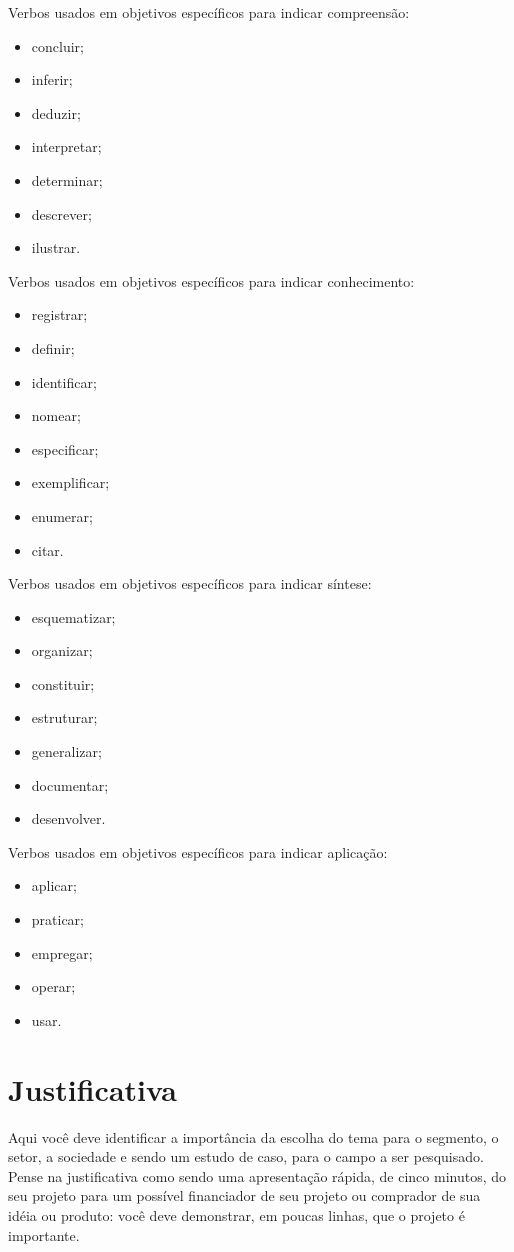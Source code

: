 Verbos usados em objetivos específicos para indicar compreensão:
\begin{itemize}
\item concluir;
\item inferir;
\item deduzir;
\item interpretar;
\item determinar;
\item descrever;
\item ilustrar.
\end{itemize}

Verbos usados em objetivos específicos para indicar conhecimento:
\begin{itemize}
\item registrar;
\item definir;
\item identificar;
\item nomear;
\item especificar;
\item exemplificar;
\item enumerar;
\item citar.
\end{itemize}

Verbos usados em objetivos específicos para indicar síntese:
\begin{itemize}
\item esquematizar;
\item organizar;
\item constituir;
\item estruturar;
\item generalizar;
\item documentar;
\item desenvolver.
\end{itemize}

Verbos usados em objetivos específicos para indicar aplicação:
\begin{itemize}
\item aplicar;
\item praticar;
\item empregar;
\item operar;
\item usar.
\end{itemize}


\section{Justificativa}
\label{sec:intro:jus}

Aqui você deve identificar a importância da escolha do tema para o segmento, o
setor, a sociedade e sendo um estudo de caso, para o campo a ser
pesquisado. Pense na justificativa como sendo uma apresentação rápida, de cinco
minutos, do seu projeto para um possível financiador de seu projeto ou comprador
de sua idéia ou produto: você deve demonstrar, em poucas linhas, que o projeto é
importante.
